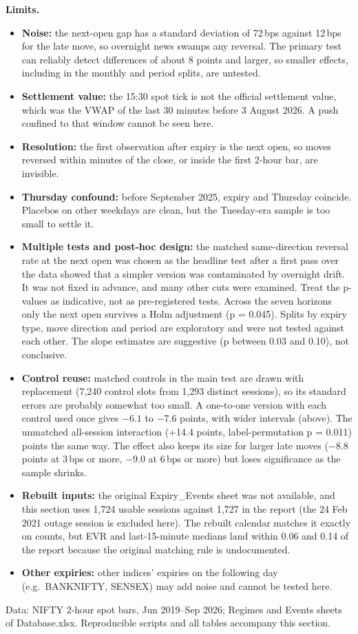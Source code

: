 \documentclass[10pt,a4paper]{article}
\newcommand{\bps}{\,bps\xspace}
\begin{document}
\textbf{Limits.}
\begin{itemize}
\item \textbf{Noise:} the next-open gap has a standard deviation of 72\bps against 12\bps for the late move, so overnight news swamps any reversal. The primary test can reliably detect differences of about 8 points and larger, so smaller effects, including in the monthly and period splits, are untested.
\item \textbf{Settlement value:} the 15:30 spot tick is not the official settlement value, which was the VWAP of the last 30 minutes before 3 August 2026. A push confined to that window cannot be seen here.
\item \textbf{Resolution:} the first observation after expiry is the next open, so moves reversed within minutes of the close, or inside the first 2-hour bar, are invisible.
\item \textbf{Thursday confound:} before September 2025, expiry and Thursday coincide. Placebos on other weekdays are clean, but the Tuesday-era sample is too small to settle it.
\item \textbf{Multiple tests and post-hoc design:} the matched same-direction reversal rate at the next open was chosen as the headline test after a first pass over the data showed that a simpler version was contaminated by overnight drift. It was not fixed in advance, and many other cuts were examined. Treat the p-values as indicative, not as pre-registered tests. Across the seven horizons only the next open survives a Holm adjustment (p = 0.045). Splits by expiry type, move direction and period are exploratory and were not tested against each other. The slope estimates are suggestive (p between 0.03 and 0.10), not conclusive.
\item \textbf{Control reuse:} matched controls in the main test are drawn with replacement (7{,}240 control slots from 1{,}293 distinct sessions), so its standard errors are probably somewhat too small. A one-to-one version with each control used once gives $-6.1$ to $-7.6$ points, with wider intervals (above). The unmatched all-session interaction (+14.4 points, label-permutation p = 0.011) points the same way. The effect also keeps its size for larger late moves ($-8.8$ points at 3\bps or more, $-9.0$ at 6\bps or more) but loses significance as the sample shrinks.
\item \textbf{Rebuilt inputs:} the original Expiry\_Events sheet was not available, and this section uses 1{,}724 usable sessions against 1{,}727 in the report (the 24 Feb 2021 outage session is excluded here). The rebuilt calendar matches it exactly on counts, but EVR and last-15-minute medians land within 0.06 and 0.14 of the report because the original matching rule is undocumented.
\item \textbf{Other expiries:} other indices' expiries on the following day (e.g.\ BANKNIFTY, SENSEX) may add noise and cannot be tested here.
\end{itemize}

\vfill
{\footnotesize\color{ink2} Data: NIFTY 2-hour spot bars, Jun 2019--Sep 2026; Regimes and Events sheets of Database.xlsx. Reproducible scripts and all tables accompany this section.}
\end{document}
